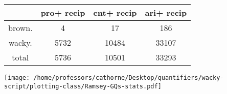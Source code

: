 \documentclass[a4,10pt]{article}
\begin{document}
\begin{sidewaystable}[p]
\tiny{\begin{tabular}{|c|c|c|c|}
 & pro+
recip & cnt+
recip & ari+
recip\\
\hline
brown. & 4 & 17 & 186\\
wacky. & 5732 & 10484 & 33107\\
\hline
total & 5736 & 10501 & 33293
\end{tabular}}
\end{sidewaystable}



\vspace{0.2cm}

\begin{center}
\texttt{[image: /home/professors/cathorne/Desktop/quantifiers/wacky-script/plotting-class/Ramsey-GQs-stats.pdf]}
\end{center}
\end{document}
